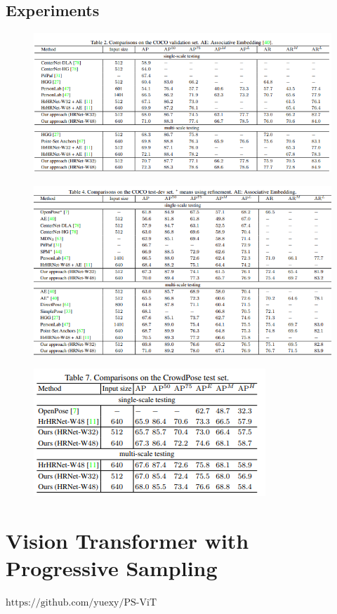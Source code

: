 \documentclass[11pt]{article}
\begin{document}
\subsection{Experiments}
\begin{figure}[H]
	\centering
	\includegraphics[scale = 0.6]{36}
\end{figure}
\begin{figure}[H]
	\centering
	\includegraphics[scale = 0.6]{37}
\end{figure}
\begin{figure}[H]
	\centering
	\includegraphics[scale = 0.6]{38}
\end{figure}
\section{Vision Transformer with Progressive Sampling}
$\text{https://github.com/yuexy/PS-ViT}$
\end{document}
